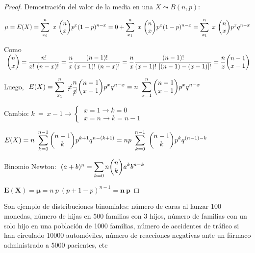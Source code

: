 \begin{proof}
 Demostración del valor de la media en una $X\leadsto B(n,p):$ 	
 
 $\mu=E(X)=\displaystyle \sum_{x_0}^n\ x\ \mqty(n\\x)p^x(1-p)^{n-x}= 0 + 	\sum_{x_1}^n\ x\ \mqty(n\\x)p^x(1-p)^{n-x}= \sum_{x_1}^n\ x\ \mqty(n\\x)p^xq^{n-x}$
 
\begin{small}  Como $\ \mqty(n\\x)=\dfrac{n!}{x! \ (n-x)!}=\dfrac n x \dfrac{(n-1)!}{(x-1)!\ (n-x)!}= \dfrac n x \dfrac{(n-1)!}{(x-1)!\ [(n-1)-(x-1)]!}=\dfrac n x \mqty(n-1\\x-1)$ \end{small}

Luego, $\ E(X)=\displaystyle \sum_{x_1}^n \ \cancel{x} \dfrac {n}{\cancel{x}}
\mqty(n-1\\x-1) p^x q^{n-x}= n\ \sum_{x=1}^{n}\mqty(n-1\\x-1)p^xq^{n-x}$

Cambio: $ k\ = \ x-1 \to \begin{cases}
 \ x=1 \to k=0 \\ \ x=n \to k=n-1	
 \end{cases}$
 
 $E(X)=n \ \displaystyle \sum_{k=0}^{n-1} \mqty(n-1\\k)p^{k+1}q^{n-(k+1)}=
 np\ \sum_{k=0}^{n-1} \ \mqty(n-1\\k)p^kq^{(n-1)-k}$
 
 Binomio Newton: $\ (a+b)^n=\displaystyle \sum_{k=0}{n}\mqty(n\\k)a^kb^{n-k}$
 
 $\boldsymbol{ E(X)=\mu=} n\ p \ (p+1-p)^{n-1}= \boldsymbol{ n \ p}$

\end{proof}


\vspace{4mm} Son ejemplo de distribuciones binomiales:
número de caras al lanzar 100 monedas, número de hijas en 500 familias con 3 hijos,  número de familias con un solo hijo en una población de 1000 familias, número de accidentes de tráfico si han circulado 10000 automóviles, número de reacciones negativas ante un fármaco administrado a 5000 pacientes, etc

